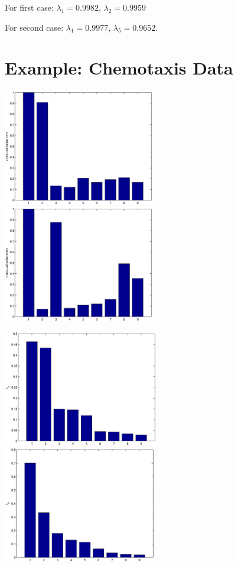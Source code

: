 \documentclass[12pt]{article}
\begin{document}
For first case: $\lambda_1 = 0.9982$, $\lambda_2 = 0.9959$

For second case: $\lambda_1 = 0.9977$, $\lambda_5 = 0.9652$.

\section{Example: Chemotaxis Data}

\centering
\includegraphics[height=2in]{lle_errors1}
\includegraphics[height=2in]{lle_errors2}

\includegraphics[height=2in]{lle_evals1}
\includegraphics[height=2in]{lle_evals2}
\end{document}
